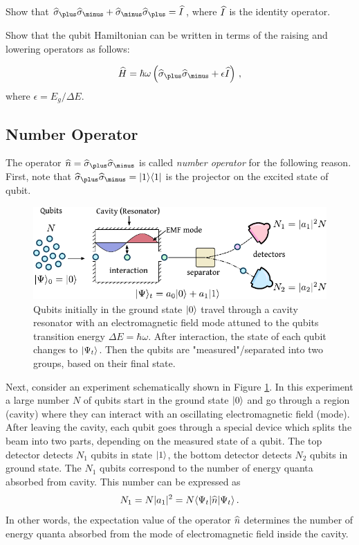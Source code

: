 \begin{exercise}
	Show that  $\op{\sigma}_\plus \op{\sigma}_\minus+\op{\sigma}_\minus \op{\sigma}_\plus=\op{I}$, where $\widehat{I}$ is the identity operator.
\end{exercise}

\begin{exercise}
	Show that the qubit Hamiltonian can be written in terms of the raising and lowering operators as follows:
	
	\[
	\op{H} = \hbar\omega\left(\op{\sigma}_\plus \op{\sigma}_\minus+\epsilon\op{I} \right)\,,
	\]
	where $\epsilon=E_g/\Delta E$.
\end{exercise}

\subsection{Number Operator}
The operator $\op{n}=\op{\sigma}_\plus \op{\sigma}_\minus$ is called \emph{number operator} for the following reason. First, note that $\op{\sigma}_\plus \op{\sigma}_\minus=\ketbra{1}{1}$ is the projector on the excited state of qubit.
\begin{figure}[htbp]
	\centering
	\includegraphics[scale=1.0]{qubitNumberOperatorMeaning}
	\caption{Qubits initially in the ground state $|{0}\rangle$ travel through a cavity resonator with an electromagnetic field mode attuned to the qubits transition energy $\Delta E=\hbar\omega$. After interaction, the state of each qubit changes to $|{\Psi_t}\rangle$. Then the qubits are "measured"/separated into two groups, based on their final state.}
	\label{fig:qubitNumberOperatorMeaning}
\end{figure}

Next, consider an experiment schematically shown in Figure \ref{fig:qubitNumberOperatorMeaning}. In this experiment a large number $N$ of qubits start in the ground state $|{0}\rangle$ and go through a region (cavity) where they can interact with an oscillating electromagnetic field (mode). After leaving the cavity, each qubit goes through a special device which splits the beam into two parts, depending on the measured state of a qubit. The top detector detects $N_1$ qubits in state $|{1}\rangle$, the bottom detector detects $N_2$ qubits in ground state. The $N_1$  qubits correspond to the number of energy quanta absorbed from cavity. This number can be expressed as
\[
N_1=N |a_1|^2=N\langle{\Psi_t}|\widehat{n}|{\Psi_t}\rangle\,.
\]  
In other words, the expectation value of the operator $\widehat{n}$ determines the number of energy quanta absorbed from the mode of electromagnetic field inside the cavity.
 

